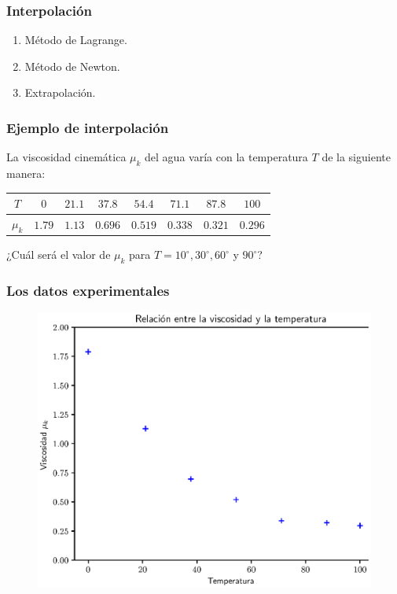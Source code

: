 \documentclass[12pt]{beamer}
\begin{document}
\begin{frame}
\frametitle{Interpolación}
\begin{enumerate}[<+->]
\item Método de Lagrange.
\item Método de Newton.
\item Extrapolación.
\end{enumerate}
\end{frame}
\begin{frame}
\frametitle{Ejemplo de interpolación}
La viscosidad cinemática $\mu_{k}$ del agua varía con la temperatura $T$ de la siguiente manera:
\pause
\begin{table}[H]
\centering
\begin{tabular}{c | c | c | c | c | c | c | c }
$T$ & $0$ & $21.1$ & $37.8$ & $54.4$ & $71.1$ & $87.8$ & $100$ \\ \hline
$\mu_{k}$ & $1.79$ & $1.13$ & $0.696$ & $0.519$ & $0.338$ & $0.321$ & $0.296$ 
\end{tabular}
\end{table}
\pause
¿Cuál será el valor de $\mu_{k}$ para $T = 10^{\circ},30^{\circ},60^{\circ}$ y $90^{\circ}$?
\end{frame}
\begin{frame}
\frametitle{Los datos experimentales}
\begin{figure}
    \centering
    \includegraphics[scale=0.575]{Imagenes/Intro_Interpolacion_01.eps}
\end{figure}
\end{frame}
\end{document}
